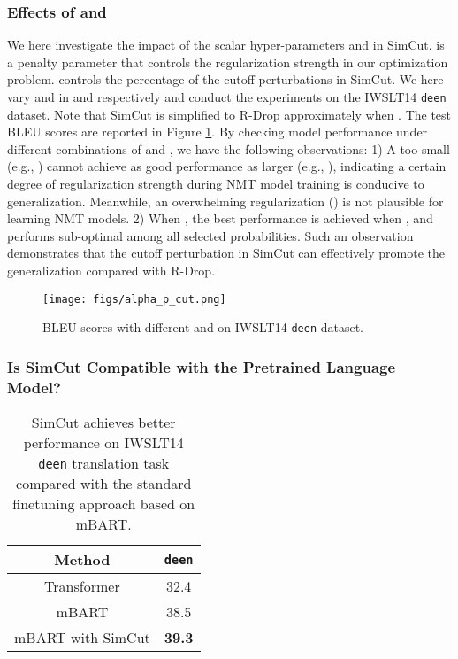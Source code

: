 \documentclass[11pt]{article}
\begin{document}
\subsubsection{Effects of  and }

We here investigate the impact of the scalar hyper-parameters  and  in SimCut.  is a penalty parameter that controls the regularization strength in our optimization problem.  controls the percentage of the cutoff perturbations in SimCut. We here vary  and  in  and  respectively and conduct the experiments on the IWSLT14 \texttt{de}\texttt{en} dataset. Note that SimCut is simplified to R-Drop approximately when . The test BLEU scores are reported in Figure \ref{fig: alpha_p}. By checking model performance under different combinations of  and , we have the following observations: 1) A too small  (e.g., ) cannot achieve as good performance as larger  (e.g., ), indicating a certain degree of regularization strength during NMT model training is conducive to generalization. Meanwhile, an overwhelming regularization () is not plausible for learning NMT models. 2) When , the best performance is achieved when , and  performs sub-optimal among all selected probabilities. Such an observation demonstrates that the cutoff perturbation in SimCut can effectively promote the generalization compared with R-Drop. 

\begin{figure}[h]
\centering
\texttt{[image: figs/alpha\_p\_cut.png]}
\caption{BLEU scores with different  and  on IWSLT14 \texttt{de}\texttt{en} dataset.}
\label{fig: alpha_p}
\end{figure}

\subsubsection{Is SimCut Compatible with the Pretrained Language Model?}

\begin{table}
\centering
\begin{tabular}{c|c}
\hline
Method & \texttt{de}\texttt{en} \\
\hline\hline
Transformer  & 32.4 \\
mBART & 38.5 \\
\hline
mBART with SimCut & \bf 39.3 \\
\end{tabular}
\caption{SimCut achieves better performance on IWSLT14 \texttt{de}\texttt{en} translation task compared with the standard finetuning approach based on mBART. \label{mbart}}
\end{table}
\end{document}
